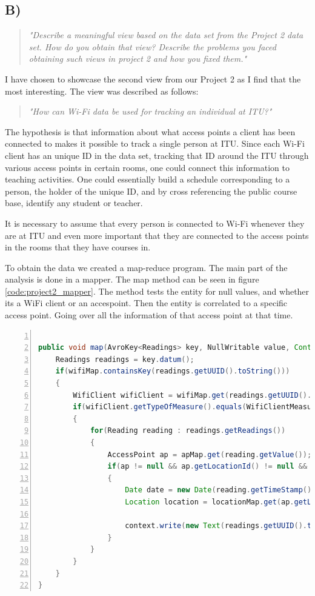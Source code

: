 \subsection{B)}
\begin{quote}
		\textit{"Describe	a	meaningful	view	based	on	the	data	set	from	the	Project	2	data	set.	How	do	you	obtain	that	view?	Describe	the	problems	you	faced	obtaining	such	views	in	project	2	and	how	you	fixed	them."}
\end{quote}
I have chosen to showcase the second view from our Project 2 as I find that the most interesting. The view was described as follows: 
\begin{quote}
	\textit{"How can Wi-Fi data be used for tracking an individual at ITU?"}
\end{quote}
The hypothesis is that information about what access points a client has been connected to makes it possible to track a single person at ITU. Since each Wi-Fi client has an unique ID in the data set, tracking that ID around the ITU through various access points in certain rooms, one could connect this information to teaching activities. One could essentially build a schedule corresponding to a person, the holder of the unique ID, and by cross referencing the public course base, identify any student or teacher. 


It is necessary to assume that every person is connected to Wi-Fi whenever they are at ITU and even more important that they are connected to the access points in the rooms that they have courses in. 

To obtain the data we created a map-reduce program. The main part of the analysis is done in a mapper. The map method can be seen in figure \ref{code:project2_mapper}. The method tests the entity for null values, and whether its a WiFi client or an accespoint. Then the entity is correlated to a specific access point. Going over all the information of that access point at that time. 

 \begin{lstlisting}[frame=single, backgroundcolor=\color{light-gray}, basicstyle=\footnotesize\ttfamily, language=Java, numbers=left, numberstyle=\tiny \color{black}, breaklines=true, label=code:project2_mapper]
 
public void map(AvroKey<Readings> key, NullWritable value, Context context) throws IOException, InterruptedException {
    Readings readings = key.datum();
    if(wifiMap.containsKey(readings.getUUID().toString()))
	{
        WifiClient wifiClient = wifiMap.get(readings.getUUID().toString());
		if(wifiClient.getTypeOfMeasure().equals(WifiClientMeasure.AccessPoint))
		{
		    for(Reading reading : readings.getReadings())
			{
				AccessPoint ap = apMap.get(reading.getValue());
				if(ap != null && ap.getLocationId() != null && locationMap.containsKey(ap.getLocationId()))
				{
					Date date = new Date(reading.getTimeStamp());
					Location location = locationMap.get(ap.getLocationId());
					 
					context.write(new Text(readings.getUUID().toString()), new Text(location.getRoom() + "-" + dateFormat.format(date)));
				}
			}
		}
	}
}
\end{lstlisting}

